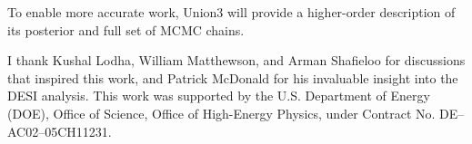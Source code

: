 \documentclass{aastex631}
\begin{document}
To enable more accurate work, Union3 will provide a higher-order description of its posterior and full set of MCMC chains.

\begin{acknowledgments}
I thank Kushal Lodha, William Matthewson, and Arman Shafieloo for discussions that inspired this work, 
and Patrick McDonald for his invaluable insight into the DESI analysis.
This work was supported by the U.S. Department of Energy (DOE), Office
of Science, Office of High-Energy Physics, under Contract No. DE–AC02–05CH11231.
\end{acknowledgments}



\end{document}
